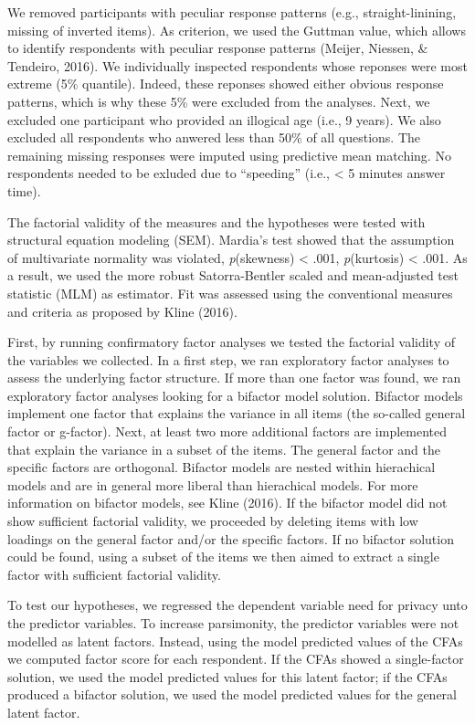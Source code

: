 \documentclass[man,floatsintext]{apa6}
\theoremstyle{definition}
\theoremstyle{definition}
\theoremstyle{definition}
\theoremstyle{remark}
\begin{document}
We removed participants with peculiar response patterns (e.g.,
straight-linining, missing of inverted items). As criterion, we used the
Guttman value, which allows to identify respondents with peculiar
response patterns (Meijer, Niessen, \& Tendeiro, 2016). We individually
inspected respondents whose reponses were most extreme (5\% quantile).
Indeed, these reponses showed either obvious response patterns, which is
why these 5\% were excluded from the analyses. Next, we excluded one
participant who provided an illogical age (i.e., 9 years). We also
excluded all respondents who anwered less than 50\% of all questions.
The remaining missing responses were imputed using predictive mean
matching. No respondents needed to be exluded due to \enquote{speeding}
(i.e., \textless{} 5 minutes answer time).

The factorial validity of the measures and the hypotheses were tested
with structural equation modeling (SEM). Mardia's test showed that the
assumption of multivariate normality was violated, \emph{p}(skewness)
\textless{} .001, \emph{p}(kurtosis) \textless{} .001. As a result, we
used the more robust Satorra-Bentler scaled and mean-adjusted test
statistic (MLM) as estimator. Fit was assessed using the conventional
measures and criteria as proposed by Kline (2016).

First, by running confirmatory factor analyses we tested the factorial
validity of the variables we collected. In a first step, we ran
exploratory factor analyses to assess the underlying factor structure.
If more than one factor was found, we ran exploratory factor analyses
looking for a bifactor model solution. Bifactor models implement one
factor that explains the variance in all items (the so-called general
factor or g-factor). Next, at least two more additional factors are
implemented that explain the variance in a subset of the items. The
general factor and the specific factors are orthogonal. Bifactor models
are nested within hierachical models and are in general more liberal
than hierachical models. For more information on bifactor models, see
Kline (2016). If the bifactor model did not show sufficient factorial
validity, we proceeded by deleting items with low loadings on the
general factor and/or the specific factors. If no bifactor solution
could be found, using a subset of the items we then aimed to extract a
single factor with sufficient factorial validity.

To test our hypotheses, we regressed the dependent variable need for
privacy unto the predictor variables. To increase parsimonity, the
predictor variables were not modelled as latent factors. Instead, using
the model predicted values of the CFAs we computed factor score for each
respondent. If the CFAs showed a single-factor solution, we used the
model predicted values for this latent factor; if the CFAs produced a
bifactor solution, we used the model predicted values for the general
latent factor.
\end{document}
